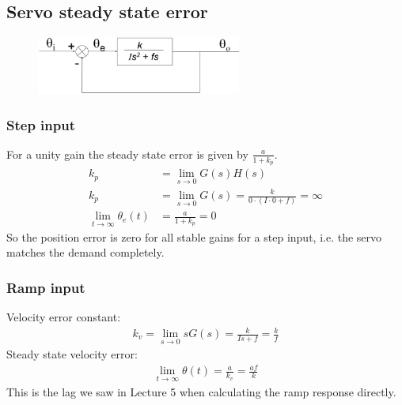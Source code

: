 \documentclass[class=report, crop=false, 12pt,a4paper]{standalone}
\begin{document}
\subsection{Servo steady state error}
\begin{figure}[H]
  \centerline{\includegraphics[width = 0.6\textwidth]{../img/diagram107.png}}
  \caption{}
\end{figure}
\subsubsection{Step input}
For a unity gain the steady state error is given by $\frac{a}{1 + k_p}$.
\begin{align}
  k_p &= \lim_{s\rightarrow 0} G(s)H(s)\\
  k_p &= \lim_{s\rightarrow 0} G(s) = \frac{k}{0\cdot (I\cdot 0 + f)} = \infty\\
  \lim_{t\rightarrow \infty} \theta_e (t) &= \frac{a}{1+k_p} = 0
\end{align}
So the position error is zero for all stable gains for a step input, i.e. the servo matches the demand completely.
\subsubsection{Ramp input}
Velocity error constant:
\begin{align}
  k_v = \lim_{s\rightarrow 0} sG(s) = \frac{k}{Is +f} = \frac{k}{f}
\end{align}
Steady state velocity error:
\begin{align}
  \lim_{t\rightarrow \infty} \theta (t) = \frac{a}{k_v} = \frac{af}{k}
\end{align}
This is the lag we saw in Lecture 5 when calculating the ramp response directly.
\end{document}
